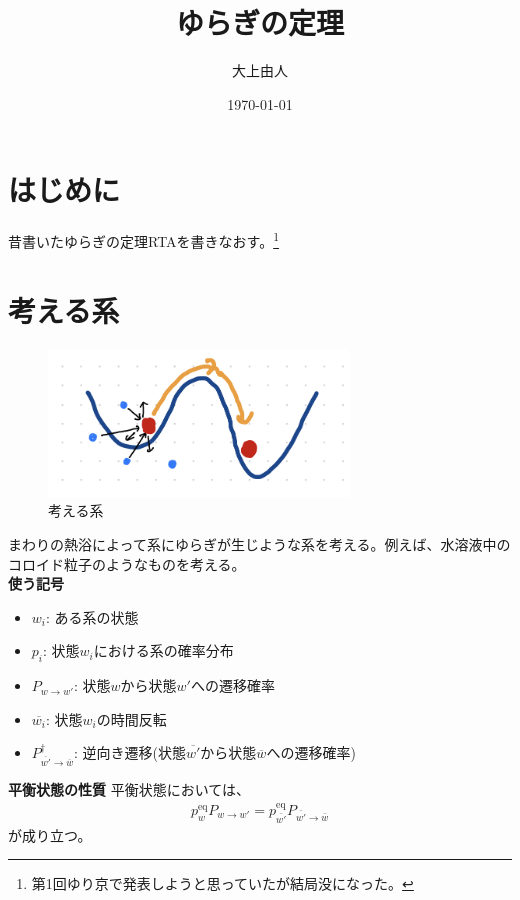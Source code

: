 \documentclass[a4paper,11pt]{jsarticle}
\numberwithin{equation}{section}
\begin{document}
\title{ゆらぎの定理}
\author{大上由人}
\date{\today}
\maketitle

\section{はじめに}
昔書いたゆらぎの定理RTAを書きなおす。\footnote{第1回ゆり京で発表しようと思っていたが結局没になった。}

\section{考える系}
\begin{figure}[H]
    \begin{center}
    \includegraphics[width=80mm]{noneq.png}
    \end{center}
    \caption{考える系}
    \label{fig:one}
\end{figure}
まわりの熱浴によって系にゆらぎが生じような系を考える。例えば、水溶液中のコロイド粒子のようなものを考える。\\

\textbf{使う記号}
\begin{itemize}
    \item $w_{i}$: ある系の状態
    \item $p_i$: 状態$w_{i}$における系の確率分布
    \item $P_{w \to w'}$: 状態$w$から状態$w'$への遷移確率
    \item $\overline{w_{i}}$: 状態$w_{i}$の時間反転
    \item $P^{\dagger}_{\overline{w'}\to \overline{w}}$: 逆向き遷移(状態$\overline{w'}$から状態$\overline{w}$への遷移確率)
\end{itemize}

\begin{itembox}[l]{\textbf{平衡状態の性質}}
    平衡状態においては、
    \begin{align}
        p_{w}^{\text{eq}}P_{w\to w'} = p_{\bar{w'}}^{\text{eq}}P_{\bar{w'}\to \bar{w}}
    \end{align}
    が成り立つ。

\end{itembox}
\end{document}

